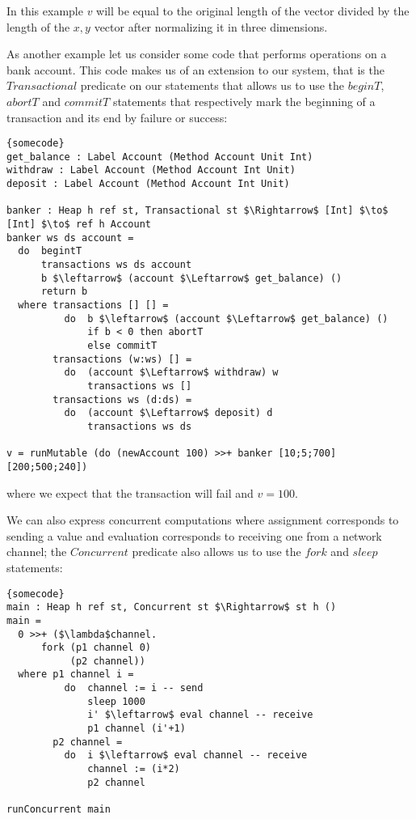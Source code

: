 \documentclass[a4paper]{article}
\begin{document}
In this example $v$ will be equal to the original length of the vector divided by the length of the $x,y$ vector after normalizing it in three
dimensions.

As another example let us consider some code that performs operations on a bank account. This code makes us of an extension to our
system, that is the $Transactional$ predicate on our statements that allows us to use the $beginT$, $abortT$ and $commitT$ statements
that respectively mark the beginning of a transaction and its end by failure or success:

\begin{lstlisting}[frame=tb,mathescape]{somecode}
get_balance : Label Account (Method Account Unit Int)
withdraw : Label Account (Method Account Int Unit)
deposit : Label Account (Method Account Int Unit)

banker : Heap h ref st, Transactional st $\Rightarrow$ [Int] $\to$ [Int] $\to$ ref h Account
banker ws ds account = 
  do  begintT
      transactions ws ds account
      b $\leftarrow$ (account $\Leftarrow$ get_balance) ()
      return b
  where transactions [] [] =
          do  b $\leftarrow$ (account $\Leftarrow$ get_balance) ()
              if b < 0 then abortT
              else commitT
        transactions (w:ws) [] = 
          do  (account $\Leftarrow$ withdraw) w
              transactions ws []
        transactions ws (d:ds) = 
          do  (account $\Leftarrow$ deposit) d
              transactions ws ds

v = runMutable (do (newAccount 100) >>+ banker [10;5;700] [200;500;240])
\end{lstlisting}

where we expect that the transaction will fail and $v = 100$.

We can also express concurrent computations where assignment corresponds to sending a value and evaluation corresponds to
receiving one from a network channel; the $Concurrent$ predicate also allows us to use the $fork$ and $sleep$ statements:

\begin{lstlisting}[frame=tb,mathescape]{somecode}
main : Heap h ref st, Concurrent st $\Rightarrow$ st h ()
main = 
  0 >>+ ($\lambda$channel.
      fork (p1 channel 0)
           (p2 channel))
  where p1 channel i =
          do  channel := i -- send
              sleep 1000
              i' $\leftarrow$ eval channel -- receive
              p1 channel (i'+1)
        p2 channel =
          do  i $\leftarrow$ eval channel -- receive
              channel := (i*2)
              p2 channel

runConcurrent main
\end{lstlisting}
\end{document}
